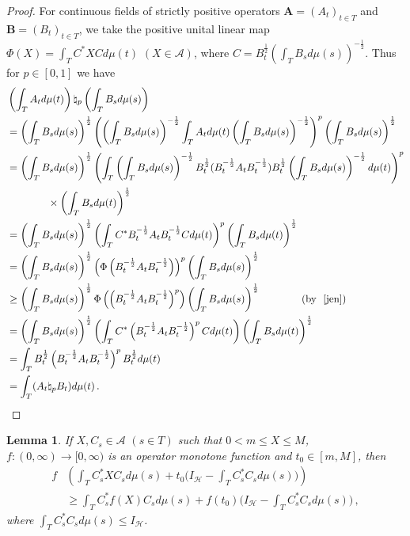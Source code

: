 \documentclass[12pt, reqno]{amsart}
\newtheorem{lemma}[theorem]{Lemma}
\theoremstyle{definition}
\theoremstyle{remark}
\numberwithin{equation}{section}
\begin{document}
\begin{proof}
For continuous fields of strictly positive operators $\mathbf{A}=(A_t)_{t\in T}$ and $\mathbf{B}=(B_t)_{t\in T}$, we take the  positive unital linear map $\Phi(X)=\int_TC^*XCd\mu(t)\,\,(X\in{\mathscr A})$, where $C=B_t^{\frac{1}{2}}\left(\int_TB_sd\mu(s)\right)^{-\frac{1}{2}}$. Thus for $p\in[0,1]$ we have
{\footnotesize\begin{align*}
&\left(\int_TA_td\mu(t)\right) \natural_p\left(\int_TB_sd\mu(s)\right)\\
&=\left(\int_TB_sd\mu(s)\right)^{\frac{1}{2}}
\left(\left(\int_TB_sd\mu(s)\right)^{-\frac{1}{2}}\int_TA_td\mu(t)\left(\int_TB_sd\mu(s)\right)^{-\frac{1}{2}}\right)^p\left(\int_TB_sd\mu(s)\right)^{\frac{1}{2}}\\
&=\left(\int_TB_sd\mu(s)\right)^{\frac{1}{2}}
\left(\int_T\left(\int_TB_sd\mu(s)\right)^{-\frac{1}{2}}B_t^{\frac{1}{2}}(B_t^{-\frac{1}{2}}A_tB_t^{-\frac{1}{2}})B_t^{\frac{1}{2}}
\left(\int_TB_sd\mu(s)\right)^{-\frac{1}{2}}d\mu(t)
\right)^p\\
&\qquad\qquad\times\left(\int_TB_sd\mu(t)\right)^{\frac{1}{2}}\\&
=\left(\int_TB_sd\mu(s)\right)^{\frac{1}{2}}
\left(\int_TC^*B_t^{-\frac{1}{2}}A_tB_t^{-\frac{1}{2}}Cd\mu(t)
\right)^p\left(\int_TB_sd\mu(t)\right)^{\frac{1}{2}}\\&=
\left(\int_TB_sd\mu(s)\right)^{\frac{1}{2}}\left(\Phi\left(B_t^{-\frac{1}{2}}A_tB_t^{-\frac{1}{2}}\right)\right)^p\left(\int_TB_sd\mu(s)\right)^{\frac{1}{2}}
\\&\geq\left(\int_TB_sd\mu(s)\right)^{\frac{1}{2}}\Phi\left(\left(B_t^{-\frac{1}{2}}A_tB_t^{-\frac{1}{2}}\right)^p\right)\left(\int_TB_sd\mu(s)\right)^{\frac{1}{2}}
\qquad\qquad(\textrm{by ~\eqref{jen}})\\&=\left(\int_TB_sd\mu(s)\right)^{\frac{1}{2}}
\left(\int_TC^*\left(B_t^{-\frac{1}{2}}A_tB_t^{-\frac{1}{2}}\right)^p Cd\mu(t)
\right)\left(\int_TB_sd\mu(t)\right)^{\frac{1}{2}}\\&=\int_TB_t^{\frac{1}{2}}\left(B_t^{-\frac{1}{2}}A_tB_t^{-\frac{1}{2}}\right)^p B_t^{\frac{1}{2}}d\mu(t)
\\&=\int_T(A_t \natural_p B_t)d\mu(t)\,.
\end{align*}}
\end{proof}
\begin{lemma}\label{2.3}
If $X, C_s\in\mathscr A\,\,(s\in T)$ such that $0<m \le X \le M$, $f:(0, \infty)\to[0, \infty)$ is an operator monotone function and $t_0\in[m, M]$, then
\begin{align*}
f&\left(\int_T C_s^*XC_sd\mu(s)+t_0\Big(I_{\mathscr H}-\int_TC_s^*C_sd\mu(s)\Big)\right)\\
&\ge \int_TC_s^*f(X)C_sd\mu(s)+f(t_0)\Big(I_{\mathscr H}-\int_TC_s^*C_sd\mu(s)\Big)\,,
\end{align*}
where  $\int_TC_s^*C_sd\mu(s)\leq I_{\mathscr H}$.
\end{lemma}
\end{document}
